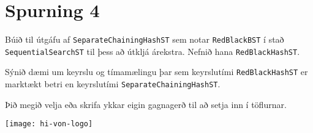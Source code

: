 \documentclass{article}
\begin{document}

\section{Spurning 4}

Búið til útgáfu af \texttt{SeparateChainingHashST} sem notar \texttt{RedBlackBST} í stað \texttt{SequentialSearchST} til þess að útkljá árekstra. Nefnið hana \texttt{RedBlackHashST}.

Sýnið dæmi um keyrslu og tímamælingu þar sem keyrslutími \texttt{RedBlackHashST} er marktækt betri en keyrslutími \texttt{SeparateChainingHashST}. 

Þið megið velja eða skrifa ykkar eigin gagnagerð til að setja inn í töflurnar.


\vfill
\texttt{[image: hi-von-logo]}
\end{document}
